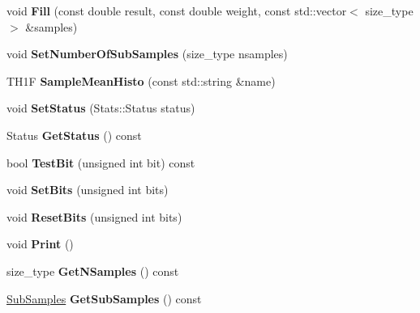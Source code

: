 \begin{DoxyCompactItemize}
\item 
\mbox{\label{classQn_1_1Stats_a8c4b01401992ea4e125fe3f7ca80ca58}} 
void {\bfseries Fill} (const double result, const double weight, const std\+::vector$<$ size\+\_\+type $>$ \&samples)
\item 
\mbox{\label{classQn_1_1Stats_a8b4081b5f3578c854f7c01a6a2670cc6}} 
void {\bfseries Set\+Number\+Of\+Sub\+Samples} (size\+\_\+type nsamples)
\item 
\mbox{\label{classQn_1_1Stats_a3d250c345e2c505b57b4cdd3598809b1}} 
T\+H1F {\bfseries Sample\+Mean\+Histo} (const std\+::string \&name)
\item 
\mbox{\label{classQn_1_1Stats_ad6b583c555e645f1962dda2fcc7f1458}} 
void {\bfseries Set\+Status} (Stats\+::\+Status status)
\item 
\mbox{\label{classQn_1_1Stats_acfa3056990eda806e7a74abc24161731}} 
Status {\bfseries Get\+Status} () const
\item 
\mbox{\label{classQn_1_1Stats_ad8079a5b6ebd39c6034f3743b7218e9e}} 
bool {\bfseries Test\+Bit} (unsigned int bit) const
\item 
\mbox{\label{classQn_1_1Stats_a91c93cfaa0e045698d48bf53a5b516ff}} 
void {\bfseries Set\+Bits} (unsigned int bits)
\item 
\mbox{\label{classQn_1_1Stats_a5b8eb6a24b45b2da1ac89df4586b357d}} 
void {\bfseries Reset\+Bits} (unsigned int bits)
\item 
\mbox{\label{classQn_1_1Stats_a164cf64ed15f9b6f33662d7b8a778e2b}} 
void {\bfseries Print} ()
\item 
\mbox{\label{classQn_1_1Stats_ad36872ae4461b311a93cd40b41db1e26}} 
size\+\_\+type {\bfseries Get\+N\+Samples} () const
\item 
\mbox{\label{classQn_1_1Stats_aedc4755917b1f200830e97777696685c}} 
\mbox{\hyperlink{classQn_1_1SubSamples}{Sub\+Samples}} {\bfseries Get\+Sub\+Samples} () const
\end{DoxyCompactItemize}
